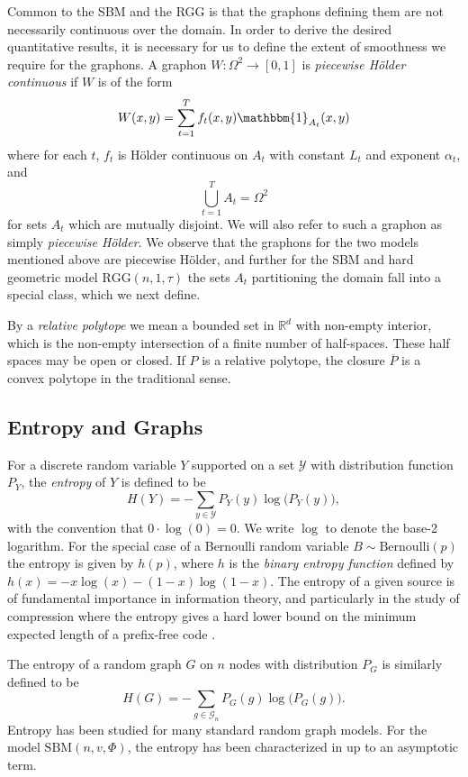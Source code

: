 \documentclass{svproc}
\newcommand{\1}{\mathbbm{1}}
\newcommand{\K}{\Omega}
\newcommand{\ol}[1]{\overline{#1}}
\begin{document}
Common to the SBM and the RGG is that the graphons defining them are not necessarily continuous over the domain. In order to derive the desired quantitative results, it is necessary for us to define the extent of smoothness we require for the graphons. A graphon $W:\K^2\to[0,1]$ is \emph{piecewise H\"{o}lder continuous} if $W$ is of the form
\begin{equation}W(x,y) = \sum_{t=1}^T f_t(x,y) \1_{A_t}(x,y)\end{equation}
where for each $t$, $f_t$ is H\"{o}lder continuous on $A_t$ with constant $L_t$ and exponent $\alpha_t$, and
\begin{equation}\bigcup_{t=1}^T A_t =\K^2\end{equation} 
for sets $A_t$ which are mutually disjoint. We will also refer to such a graphon as simply \emph{piecewise H\"{o}lder}. We observe that the graphons for the two models mentioned above are piecewise H\"{o}lder, and further for the SBM and hard geometric model $\mathrm{RGG}(n,1,\tau)$ the sets $A_t$ partitioning the domain fall into a special class, which we next define. 

By a \emph{relative polytope} we mean a bounded set in $\mathbb{R}^d$ with non-empty interior, which is the non-empty intersection of a finite number of half-spaces. These half spaces may be open or closed. If $P$ is a relative polytope, the closure $\ol{P}$ is a convex polytope in the traditional sense.

\subsection{Entropy and Graphs}\label{entropyback}
For a discrete random variable $Y$ supported on a set $\mathcal{Y}$ with distribution function $P_Y$, the \emph{entropy} of $Y$ is defined to be
\[H(Y) = -\sum_{y\in\mathcal{Y}}P_Y(y)\log\big(P_Y(y)\big),\]
with the convention that $0\cdot\log(0)=0$. We write $\log$ to denote the base-2 logarithm. For the special case of a Bernoulli random variable $B\sim\mathrm{Bernoulli}(p)$ the entropy is given by $h(p)$, where $h$ is the \emph{binary entropy function} defined by $h(x) = -x\log(x)-(1-x)\log(1-x)$. The entropy of a given source is of fundamental importance in information theory, and particularly in the study of compression where the entropy gives a hard lower bound on the minimum expected length of a prefix-free code \cite[Th. 5.4.1]{coverthomas}.


 The entropy of a random graph $G$ on $n$ nodes with distribution $P_G$ is similarly defined to be
\[H(G) = -\sum_{g\in\mathcal{G}_n}P_G(g)\log\big(P_G(g)\big).\]
Entropy has been studied for many standard random graph models. For the model $\mathrm{SBM}(n,v,\Phi)$, the entropy has been characterized in \cite{abbe2016} up to an asymptotic term.
\end{document}
